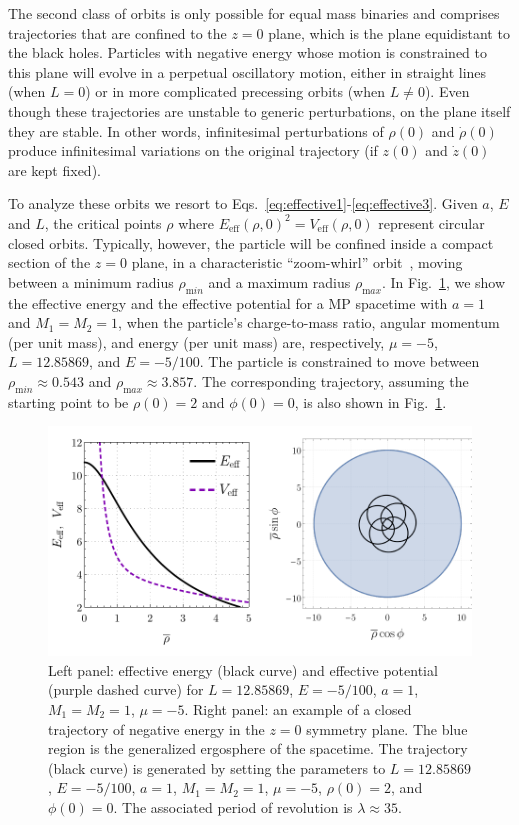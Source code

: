 The second class of orbits is only possible for equal mass binaries and comprises trajectories that are confined to the $z=0$ plane, which is the plane equidistant to the black holes. Particles with negative energy whose motion is constrained to this plane will evolve in a perpetual oscillatory motion, either in straight lines (when $L=0$) or in more complicated precessing orbits (when $L \neq 0$). Even though these trajectories are unstable to generic perturbations, on the plane itself they are stable. In other words, infinitesimal perturbations of $\rho(0)$ and $\dot \rho(0)$ produce infinitesimal variations on the original trajectory (if $z(0)$ and $\dot z(0)$ are kept fixed).

To analyze these orbits we resort to Eqs.~\eqref{eq:effective1}-\eqref{eq:effective3}. Given $a$, $E$ and $L$, the critical points $\rho$ where $E_{\mathrm{eff}}(\rho,0)^2 = V_{\mathrm{eff}}(\rho,0)$ represent circular closed orbits. Typically, however, the particle will be confined inside a compact section of the $z=0$ plane, in a characteristic ``zoom-whirl'' orbit~\cite{ASSUMPCAO2018,Levin:2008mq}, moving between a minimum radius $\rho_{\mathrm min}$ and a maximum radius $\rho_{\mathrm max}$. In Fig.~\ref{fig:orbit_closed_z}, we show the effective energy and the effective potential for a \ac{MP} spacetime with $a=1$ and $M_1 = M_2 = 1$, when the particle's charge-to-mass ratio, angular momentum (per unit mass), and energy (per unit mass) are, respectively, $\mu=-5$, $L=12.85869$, and $E=-5/100$. The particle is constrained to move between $\rho_{\mathrm min}\approx 0.543$ and $\rho_{\mathrm max}\approx 3.857$. The corresponding trajectory, assuming the starting point to be $\rho(0)=2$ and $\phi(0)=0$, is also shown in Fig.~\ref{fig:orbit_closed_z}.

\begin{figure}[!ht]
  \centering
  \includegraphics[width=\linewidth]{img/penrose_binaries/fig5.pdf}
  \caption{Left panel: effective energy (black curve) and effective potential (purple dashed curve) for $L=12.85869$, $E=-5/100$, $a=1$, $M_1 = M_2 = 1$, $\mu = -5$. Right panel: an example of a closed trajectory of negative energy in the $z = 0$ symmetry plane. The blue region is the generalized ergosphere of the spacetime. The trajectory (black curve) is generated by setting the parameters to $L=12.85869$, $E=-5/100$, $a=1$, $M_1 = M_2 = 1$, $\mu = -5$, $\rho(0) = 2$, and $\phi(0) = 0$. The associated period of revolution is $\lambda \approx 35$.}
  \label{fig:orbit_closed_z}
\end{figure}

